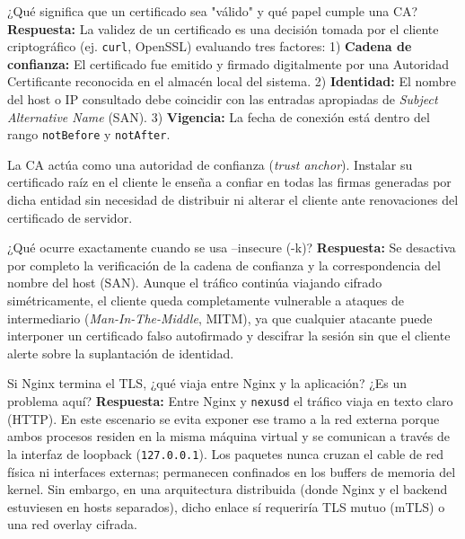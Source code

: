 \documentclass[10pt,a4paper]{article}
\begin{document}
\begin{pregunta}{¿Qué significa que un certificado sea "válido" y qué papel cumple una CA?}
    \textbf{Respuesta:} La validez de un certificado es una decisión tomada por el cliente criptográfico (ej. \texttt{curl}, OpenSSL) evaluando tres factores: 1) \textbf{Cadena de confianza:} El certificado fue emitido y firmado digitalmente por una Autoridad Certificante reconocida en el almacén local del sistema. 2) \textbf{Identidad:} El nombre del host o IP consultado debe coincidir con las entradas apropiadas de \textit{Subject Alternative Name} (SAN). 3) \textbf{Vigencia:} La fecha de conexión está dentro del rango \texttt{notBefore} y \texttt{notAfter}.
    
    La CA actúa como una autoridad de confianza (\textit{trust anchor}). Instalar su certificado raíz en el cliente le enseña a confiar en todas las firmas generadas por dicha entidad sin necesidad de distribuir ni alterar el cliente ante renovaciones del certificado de servidor.
\end{pregunta}

\begin{pregunta}{¿Qué ocurre exactamente cuando se usa --insecure (-k)?}
    \textbf{Respuesta:} Se desactiva por completo la verificación de la cadena de confianza y la correspondencia del nombre del host (SAN). Aunque el tráfico continúa viajando cifrado simétricamente, el cliente queda completamente vulnerable a ataques de intermediario (\textit{Man-In-The-Middle}, MITM), ya que cualquier atacante puede interponer un certificado falso autofirmado y descifrar la sesión sin que el cliente alerte sobre la suplantación de identidad.
\end{pregunta}

\begin{pregunta}{Si Nginx termina el TLS, ¿qué viaja entre Nginx y la aplicación? ¿Es un problema aquí?}
    \textbf{Respuesta:} Entre Nginx y \texttt{nexusd} el tráfico viaja en texto claro (HTTP). En este escenario se evita exponer ese tramo a la red externa porque ambos procesos residen en la misma máquina virtual y se comunican a través de la interfaz de loopback (\texttt{127.0.0.1}). Los paquetes nunca cruzan el cable de red física ni interfaces externas; permanecen confinados en los buffers de memoria del kernel. Sin embargo, en una arquitectura distribuida (donde Nginx y el backend estuviesen en hosts separados), dicho enlace sí requeriría TLS mutuo (mTLS) o una red overlay cifrada.
\end{pregunta}
\end{document}
